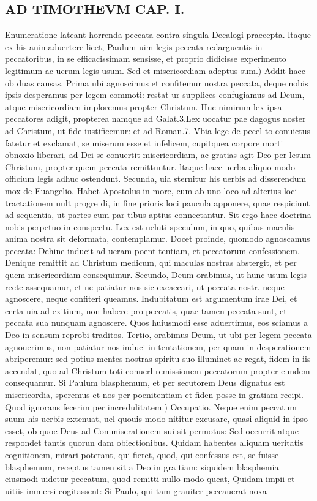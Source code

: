 \documentclass{article}
\begin{document}
\begin{pages}
\section*{AD TIMOTHEVM CAP. I. }
\marginpar{[ p.34 ]}\pstart Enumeratione lateant horrenda peccata contra singula Decalogi praecepta. ltaque  ex his animaduertere licet, Paulum uim legis peccata redarguentis in peccatoribus, in se efficacissimam sensisse, et proprio didicisse experimento legitimum ac uerum legis usum.  \pend\pstart Sed et misericordiam adeptus sum.) Addit haec ob duas causas. Prima ubi agnoscimus et confitemur nostra peccata, deque  nobis ipsis desperamus per legem commoti: restat ur supplices confugiamus ad Deum, atque  misericordiam imploremus propter Christum. Huc nimirum lex ipsa peccatores adigit, propterea namque  ad Galat.3.Lex uocatur pae dagogus noster ad Christum, ut fide iustificemur: et ad Roman.7. Vbia lege de pecel to conuictus fatetur et exclamat, se miserum esse et infelicem, cupitquea corpore morti obnoxio liberari, ad Dei se conuertit misericordiam, ac gratias agit Deo per lesum Christum, propter quem peccata remittuntur. ltaque  haec uerba aliquo modo officium legis adhuc ostendunt. Secunda, uia sternitur his uerbis ad disserendum mox de Euangelio. Habet Apostolus in more, cum ab uno loco ad alterius loci tractationem uult progre di, in fine prioris loci paucula apponere, quae respiciunt ad sequentia, ut partes cum par tibus aptius connectantur. Sit ergo haec doctrina nobis perpetuo in conspectu. Lex est ueluti speculum, in quo, quibus maculis anima nostra sit deformata, contemplamur.  \pend\pstart Docet proinde, quomodo agnoscamus peccata: Dehine inducit ad ueram poent tentiam, et peccatorum confessionem. Denique  remittit ad Christum medicum, qui maculas nostras abstergit, et per quem misericordiam consequimur. Secundo, Deum orabimus, ut hunc usum legis recte assequamur, et ne patiatur nos sic excaecari, ut peccata nostr. neque  agnoscere, neque  confiteri queamus. Indubitatum est argumentum irae Dei, et certa uia ad exitium, non habere pro peccatis, quae tamen peccata sunt, et peccata sua nunquam agnoscere. Quos huiusmodi esse aduertimus, eos sciamus a Deo in sensum reprobi traditos. Tertio, orabimus Deum, ut ubi per legem peccata agnouerimus, non patiatur nos induci in tentationem, per quam in desperationem abriperemur: sed potius mentes nostras spiritu suo illuminet ac regat, fidem in iis accendat, quo ad Christum toti conuerl remissionem peccatorum propter eundem consequamur. Si Paulum blasphemum, et per secutorem Deus dignatus est misericordia, speremus et nos per poenitentiam et fiden posse in gratiam recipi.  \pend\pstart Quod ignorans fecerim per incredulitatem.) Occupatio. Neque  enim peccatum suum his uerbis extenuat, uel quouis modo nititur excusare, quasi aliquid in ipso esset, ob quoc Deus ad Commiserationem sui sit permotus: Sed oceurrit atque  respondet tantis quorun dam obiectionibus. Quidam habentes aliquam ueritatis cognitionem, mirari poterant, qui fieret, quod, qui confessus est, se fuisse blasphemum, receptus tamen sit a Deo in gra tiam: siquidem blasphemia eiusmodi uidetur peccatum, quod remitti nullo modo queat, Quidam impii et uitiis immersi cogitassent: Si Paulo, qui tam grauiter peccauerat noxa 
\end{pages}
\end{document}
